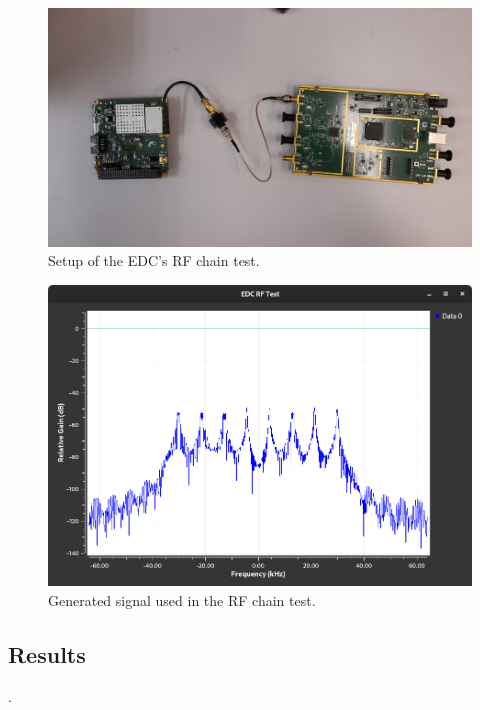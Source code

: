 \begin{figure}[!ht]
    \begin{center}
        \includegraphics[width=\textwidth]{figures/edc_report/rf-chain-setup}
        \caption{Setup of the EDC's RF chain test.}
        \label{fig:edc-rf-chain-test-setup}
    \end{center}
\end{figure}

\begin{figure}[!ht]
    \begin{center}
        \includegraphics[width=\textwidth]{figures/edc_report/edc-rf-test-signal}
        \caption{Generated signal used in the RF chain test.}
        \label{fig:edc-rf-signal}
    \end{center}
\end{figure}

\subsection{Results}

.
